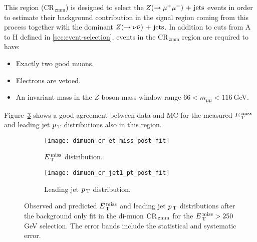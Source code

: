 This region (CR$_\mathrm{\, zmm}$) is designed to select the $Z (\rightarrow \mu^+ \mu^-)\mathrm{~+~jets}$
events in order to estimate their background contribution in the signal region
coming from this process together with the dominant $Z (\rightarrow \nu \bar{\nu})\mathrm{~+~jets}$. In
addition to cuts from A to H defined in \cref{sec:event-selection}, events in
the CR$_\mathrm{\, zmm}$ region are required to have:
\begin{itemize}
\item Exactly two good muons.
\item Electrons are vetoed.
\item An invariant mass in the $Z$ boson mass window range
  $66 < m_{\mu \mu} < 116~$GeV.
\end{itemize}
Figure~\ref{fig:dimuon_cr_plots} shows a good agreement between data and MC for
the measured $E_\mathrm{\, T}^\mathrm{\, miss}$ and leading jet $p_\mathrm{\, T}$ distributions also in this region.
\begin{figure}[!h]
  \centering
  \begin{subfigure}[t]{.48\linewidth}
    \texttt{[image: dimuon\_cr\_et\_miss\_post\_fit]}
    \caption{$E_\mathrm{\, T}^\mathrm{\, miss}$ distribution.}
    \label{fig:dimuon_cr_et_miss_pre_fit}
  \end{subfigure}
  \begin{subfigure}[t]{.48\linewidth}
    \texttt{[image: dimuon\_cr\_jet1\_pt\_post\_fit]}
    \caption{Leading jet $p_\mathrm{\, T}$ distribution.}
    \label{fig:dimuon_cr_jet1_pt_pre_fit}
  \end{subfigure}
  \caption{Observed and predicted $E_\mathrm{\, T}^\mathrm{\, miss}$ and leading jet $p_\mathrm{\, T}$ distributions
    after the background only fit in the di-muon $\mathrm{CR}_\mathrm{\, zmm}$ for the
    $E_\mathrm{\, T}^\mathrm{\, miss} > 250~$GeV selection. The error bands include the statistical and
    systematic error.}
  \label{fig:dimuon_cr_plots}
\end{figure}
